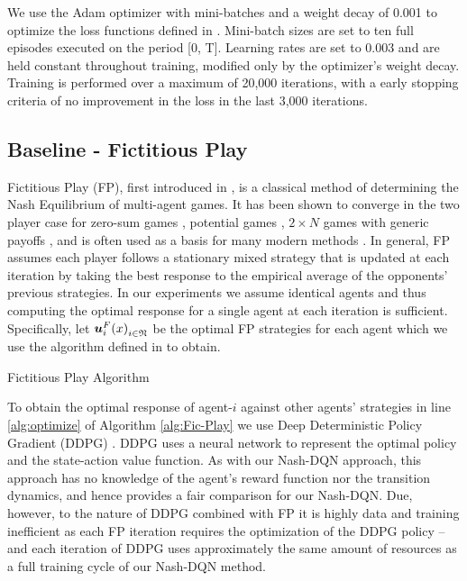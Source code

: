 \documentclass[onefignum,onetabnum]{siamonline171218}
\begin{document}
We use the Adam optimizer \cite{loshchilov2018decoupled} with mini-batches and a weight decay of 0.001 to optimize the loss functions defined in . Mini-batch sizes are set to ten full episodes executed on the period [0, T]. Learning rates are set to 0.003 and are held constant throughout training, modified only by the optimizer's weight decay. Training is performed over a maximum of 20,000 iterations, with a early stopping criteria of no improvement in the loss in the last 3,000 iterations.


\subsection{Baseline - Fictitious Play}

Fictitious Play (FP), first introduced in \cite{brown1951iterative}, is a classical method of determining the Nash Equilibrium of multi-agent games. It has been shown to converge in the two player case for zero-sum games \cite{brown1951iterative}, potential games \cite{monderer1996potential}, $2\times N$ games with generic payoffs \cite{berger2005fictitious}, and is often used as a basis for many modern methods \cite{heinrich2015fictitious}. In general, FP assumes each player follows a stationary mixed strategy that is updated at each iteration by taking the best response to the empirical average of the opponents' previous strategies. In our experiments we assume identical agents and thus computing the optimal response for a single agent at each iteration is sufficient. Specifically, let ${{\bm{u}}^F_i(x)}_{i\in {\mathfrak{N}}}$ be the optimal FP strategies for each agent which we use the algorithm defined in  to obtain.

\begin{algorithm}[t]
\setcounter{AlgoLine}{0}
	 \;
	\caption{Fictitious Play Algorithm}
	\label{alg:Fic-Play}
\end{algorithm}

To obtain the optimal response of agent-$i$ against other agents' strategies in line \ref{alg:optimize} of Algorithm \ref{alg:Fic-Play} we use Deep Deterministic Policy Gradient (DDPG) \cite{lillicrap2015continuous}. DDPG uses a neural network to represent the optimal policy and the state-action value function. As with our Nash-DQN approach, this approach has no knowledge of the agent's reward function nor the transition dynamics, and hence  provides a fair comparison for our Nash-DQN. Due, however, to the nature of DDPG combined with FP it  is highly data and training inefficient as each FP iteration requires the optimization of the DDPG policy -- and each iteration of DDPG uses approximately the same amount of resources as a full training cycle of our Nash-DQN method.  
\end{document}
